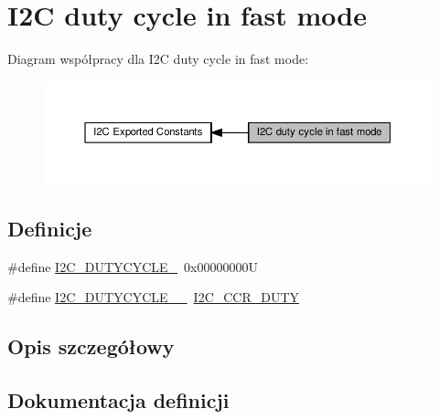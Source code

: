 \hypertarget{group___i2_c__duty__cycle__in__fast__mode}{}\section{I2C duty cycle in fast mode}
\label{group___i2_c__duty__cycle__in__fast__mode}
Diagram współpracy dla I2C duty cycle in fast mode\+:\nopagebreak
\begin{figure}[H]
\begin{center}
\leavevmode
\includegraphics[width=350pt]{group___i2_c__duty__cycle__in__fast__mode}
\end{center}
\end{figure}
\subsection*{Definicje}
\begin{DoxyCompactItemize}
\item 
\#define \hyperlink{group___i2_c__duty__cycle__in__fast__mode_ga414df076d339793a7c761033346fd4ca}{I2\+C\+\_\+\+D\+U\+T\+Y\+C\+Y\+C\+L\+E\+\_}~0x00000000U
\item 
\#define \hyperlink{group___i2_c__duty__cycle__in__fast__mode_gae9d1f8a140f052c1fcbcd87b4181f78d}{I2\+C\+\_\+\+D\+U\+T\+Y\+C\+Y\+C\+L\+E\+\_\+\_}~\hyperlink{group___peripheral___registers___bits___definition_ga851c8a6b598d54c1a805b1632a4078e5}{I2\+C\+\_\+\+C\+C\+R\+\_\+\+D\+U\+TY}
\end{DoxyCompactItemize}


\subsection{Opis szczegółowy}


\subsection{Dokumentacja definicji}
\mbox{\label{group___i2_c__duty__cycle__in__fast__mode_gae9d1f8a140f052c1fcbcd87b4181f78d}} 
